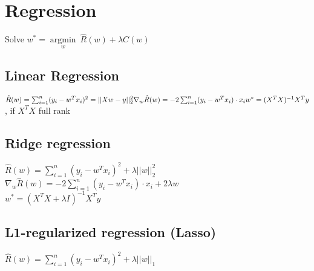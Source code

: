 \section*{Regression}
\noindent Solve $w^* = \underset{w}{\operatorname{argmin}} ~ \hat{R}(w)+ \lambda C(w)$

\subsection*{Linear Regression}
\noindent $\hat{R}(w) = \sum_{i=1}^n (y_i - w^Tx_i)^2 = ||Xw-y||^2_2\\
\nabla_w \hat{R}(w) = -2 \sum_{i=1}^n (y_i-w^T x_i) \cdot x_i \\
w^* = (X^T X)^{-1} X^T y$, if $X^T X$ full rank


\subsection*{Ridge regression}
\noindent $\hat{R}(w) = \sum_{i=1}^n (y_i - w^Tx_i)^2 + \lambda ||w||_2^2$\\
$\nabla_w \hat{R}(w) = -2 \sum_{i=1}^n (y_i-w^T x_i) \cdot x_i + 2 \lambda w$\\
$w^*=(X^T X + \lambda I)^{-1} X^T y$

\subsection*{L1-regularized regression (Lasso)}
\noindent $\hat{R}(w) = \sum_{i=1}^n (y_i - w^Tx_i)^2 + \lambda ||w||_1$